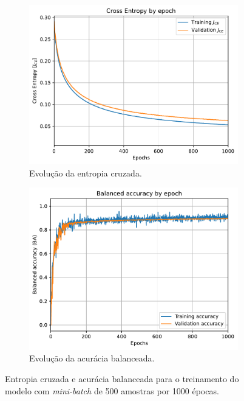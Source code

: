 \begin{figure}[H]
	\begin{subfigure}[H]{0.49\textwidth}
		\centering
		\includegraphics[width = \linewidth]{../../plot/LR_1/CE_1000_epochs_batch_size500}
		\caption{Evolução da entropia cruzada.}
		\label{fig:CE_1000_epochs_batch_size500}
	\end{subfigure}
	\begin{subfigure}[H]{0.49\textwidth}
		\centering
		\includegraphics[width = \linewidth]{../../plot/LR_1/BA_1000_epochs_batch_size500}
		\caption{Evolução da acurácia balanceada.}
		\label{fig:BA_1000_epochs_batch_size500}
	\end{subfigure}
	\caption{Entropia cruzada e acurácia balanceada para o treinamento do modelo com \textit{mini-batch} de 500 amostras por 1000 épocas.}
\end{figure}





